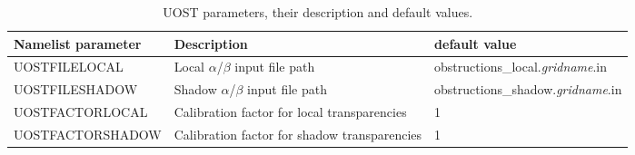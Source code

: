 \begin{table} \begin{center}
 \scriptsize
\begin{tabular}{|p{4cm}|p{4cm}|p{4cm}|} \hline \hline
Namelist parameter    &  Description           & default value \\
\hline
  UOSTFILELOCAL &  Local $\alpha$/$\beta$ input file path   &  obstructions\_local.\textit{gridname}.in    \\ \hline
  UOSTFILESHADOW &  Shadow $\alpha$/$\beta$ input file path   & obstructions\_shadow.\textit{gridname}.in   \\ \hline
  UOSTFACTORLOCAL &  Calibration factor for local transparencies  &  1   \\ \hline
  UOSTFACTORSHADOW &  Calibration factor for shadow transparencies  &  1  \\
\hline
\end{tabular} \end{center}
\caption{UOST parameters, their description and default values. } \label{tab:UOST}
\botline
\end{table}

